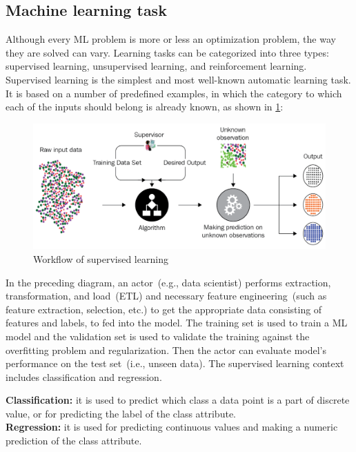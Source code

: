 \subsection{Machine learning task}
Although every ML problem is more or less an optimization problem, the way they are solved can vary. Learning tasks can be categorized into three types: supervised learning, unsupervised learning, and reinforcement learning. Supervised learning is the simplest and most well-known automatic learning task. It is based on a number of predefined examples, in which the category to which each of the inputs should belong is already known, as shown in \cref{fig:ml_pipeline_sup}:

\begin{figure}[h]
	\centering
	\includegraphics[width=\linewidth]{images/sup.png}
	\caption{Workflow of supervised learning~\cite{karimScalaML2019}} 
	\label{fig:ml_pipeline_sup}
\end{figure}

\hspace*{3.5mm} In the preceding diagram, an actor~(e.g., data scientist) performs extraction, transformation, and load~(ETL) and necessary feature engineering~(such as feature extraction, selection, etc.) to get the appropriate data consisting of features and labels, to fed into the model. The training set is used to train a ML model and the validation set is used to validate the training against the overfitting problem and regularization. Then the actor can evaluate model's performance on the test set~(i.e., unseen data). The supervised learning context includes classification and regression. 

\vspace{1mm}
\begin{tcolorbox}[colback=white!3!white,colframe=gray!120!black,title=\faBook~Classification vs. regression:]
    \scriptsize{
        \textbf{Classification:} it is used to predict which class a data point is a part of discrete value, or for predicting the label of the class attribute. \\
        \textbf{Regression:} it is used for predicting continuous values and making a numeric prediction of the class attribute.
        } \\
\end{tcolorbox}

